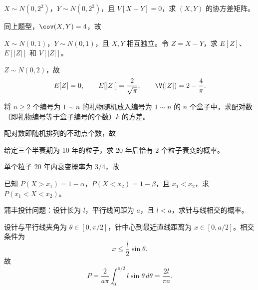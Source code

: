 \begin{question}
$X\sim N(0,2^2)$，$Y\sim N(0,2^2)$，且 $V[X-Y]=0$，求 $(X,Y)$ 的协方差矩阵。
\begin{solution}
同上题型，$\cov(X,Y)=4$，故
\end{solution}
\end{question}

\begin{question}
$X\sim N(0,1)$，$Y\sim N(0,1)$，且 $X,Y$ 相互独立。令 $Z=X-Y$，求 $E[Z]$、$E[|Z|]$ 和 $V[|Z|]$。
\begin{solution}
$Z\sim N(0,2)$，故
\[
E[Z]=0,
\qquad E[|Z|]=\frac{2}{\sqrt\pi},
\qquad \V(|Z|)=2-\frac{4}{\pi}.
\]
\end{solution}
\end{question}

\begin{question}
将 $n\ge2$ 个编号为 $1\sim n$ 的礼物随机放入编号为 $1\sim n$ 的 $n$ 个盒子中，求配对数（即礼物编号等于盒子编号的个数）$k$ 的方差。
\begin{solution}
配对数即随机排列的不动点个数，故
\end{solution}
\end{question}

\begin{question}
给定三个半衰期为 10 年的粒子，求 20 年后恰有 2 个粒子衰变的概率。
\begin{solution}
单个粒子 $20$ 年内衰变概率为 $3/4$，故
\end{solution}
\end{question}

\begin{question}
已知 $P(X>x_1)=1-\alpha$，$P(X<x_2)=1-\beta$，且 $x_1<x_2$，求 $P(x_1<X<x_2)$。
\begin{solution}

\end{solution}
\end{question}

\begin{question}[10 分]
蒲丰投针问题：设针长为 $l$，平行线间距为 $a$，且 $l<a$，求针与线相交的概率。
\begin{solution}
设针与平行线夹角为 $\theta\in[0,\pi/2]$，针中心到最近直线距离为 $x\in[0,a/2]$。相交条件为
\[
x\le \frac{l}{2}\sin\theta.
\]
故
\[
P=\frac{2}{a\pi}\int_0^{\pi/2} l\sin\theta\,d\theta
=\frac{2l}{\pi a}.
\]
\end{solution}
\end{question}

